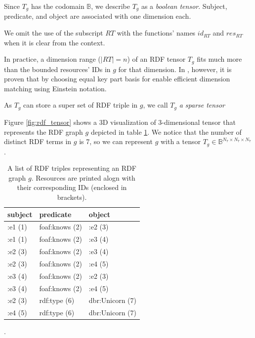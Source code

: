 Since $T_g$ has the codomain $\mathbb{B}$, we describe $T_g$ as a \textit{boolean tensor}. Subject, predicate, and object are associated with one dimension each. 

\begin{remark}
	We omit the use of the subscript $RT$ with the functions' names $id_{RT}$ and $res_{RT}$ when it is clear from the context. 
\end{remark}

\begin{remark}
	In practice, a dimension range  ($|RT| =n$) of an RDF tensor $T_g$ fits much more than the bounded resources' IDs in $g$ for that dimension. In \cite{tentris2020}, however, it is proven that by choosing equal key part basis for enable efficient dimension matching using Einstein notation.
\end{remark}

\begin{remark}
	As $T_g$ can store a super set of RDF triple in $g$, we call $T_g$ \textit{a sparse tensor}
\end{remark}

\begin{example}
\label{ex:rdf_tensor}
Figure \ref{fig:rdf_tensor} shows a 3D visualization of 3-dimensional tensor that represents the RDF graph $g$ depicted in table \ref{tab:rdf_tensor}. We notice that the number of distinct RDF terms in $g$ is 7, so we can represent $g$ with a tensor $T_g \in \mathbb{B}^{N_7 \times N_7 \times N_7}$. 
\end{example}

\begin{table}[h]
	\centering
	\begin{tabular}{lll}
		\textbf{subject} & \textbf{predicate} & \textbf{object} \\ \hline
		:e1 (1) & foaf:knows (2) & :e2 (3) \\
		:e1 (1) & foaf:knows (2) & :e3 (4) \\
		:e2 (3) & foaf:knows (2) & :e3 (4) \\
		:e2 (3) & foaf:knows (2) & :e4 (5)  \\
		:e3 (4) & foaf:knows (2) & :e2 (3) \\ 
		:e3 (4) & foaf:knows (2) & :e4 (5) \\
		:e2 (3) & rdf:type (6) & dbr:Unicorn (7) \\
		:e4 (5) & rdf:type (6) & dbr:Unicorn (7) \\
	\end{tabular}
	\caption{A list of RDF triples representing an RDF graph $g$. Resources are printed alogn with their corresponding IDs (enclosed in brackets).}. 
	\label{tab:rdf_tensor}
\end{table}

